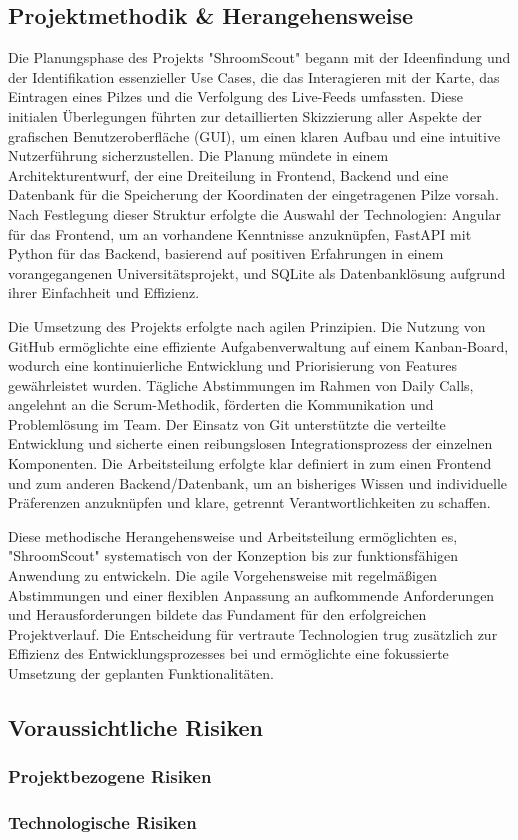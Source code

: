\documentclass[../main.tex]{subfiles}
\begin{document}
\subsection{Projektmethodik \& Herangehensweise}
Die Planungsphase des Projekts "ShroomScout" begann mit der Ideenfindung und der Identifikation essenzieller Use Cases, 
die das Interagieren mit der Karte, das Eintragen eines Pilzes und die Verfolgung des Live-Feeds umfassten. Diese initialen 
Überlegungen führten zur detaillierten Skizzierung aller Aspekte der grafischen Benutzeroberfläche (GUI), um einen klaren 
Aufbau und eine intuitive Nutzerführung sicherzustellen. Die Planung mündete in einem Architekturentwurf, der eine Dreiteilung 
in Frontend, Backend und eine Datenbank für die Speicherung der Koordinaten der eingetragenen Pilze vorsah. Nach Festlegung 
dieser Struktur erfolgte die Auswahl der Technologien: Angular für das Frontend, um an vorhandene Kenntnisse anzuknüpfen, 
FastAPI mit Python für das Backend, basierend auf positiven Erfahrungen in einem vorangegangenen Universitätsprojekt, und 
SQLite als Datenbanklösung aufgrund ihrer Einfachheit und Effizienz.

Die Umsetzung des Projekts erfolgte nach agilen Prinzipien. Die Nutzung von GitHub ermöglichte eine effiziente Aufgabenverwaltung 
auf einem Kanban-Board, wodurch eine kontinuierliche Entwicklung und Priorisierung von Features gewährleistet wurden. Tägliche 
Abstimmungen im Rahmen von Daily Calls, angelehnt an die Scrum-Methodik, förderten die Kommunikation und Problemlösung im Team. 
Der Einsatz von Git unterstützte die verteilte Entwicklung und sicherte einen reibungslosen Integrationsprozess der einzelnen 
Komponenten. Die Arbeitsteilung erfolgte klar definiert in zum einen Frontend und zum anderen Backend/Datenbank, um an bisheriges
Wissen und individuelle Präferenzen anzuknüpfen und klare, getrennt Verantwortlichkeiten zu schaffen.

Diese methodische Herangehensweise und Arbeitsteilung ermöglichten es, "ShroomScout" systematisch von der Konzeption bis zur 
funktionsfähigen Anwendung zu entwickeln. Die agile Vorgehensweise mit regelmäßigen Abstimmungen und einer flexiblen Anpassung 
an aufkommende Anforderungen und Herausforderungen bildete das Fundament für den erfolgreichen Projektverlauf. Die Entscheidung 
für vertraute Technologien trug zusätzlich zur Effizienz des Entwicklungsprozesses bei und ermöglichte eine fokussierte Umsetzung 
der geplanten Funktionalitäten.

\subsection{Voraussichtliche Risiken}
\subsubsection{Projektbezogene Risiken}


\subsubsection{Technologische Risiken}
\end{document}
